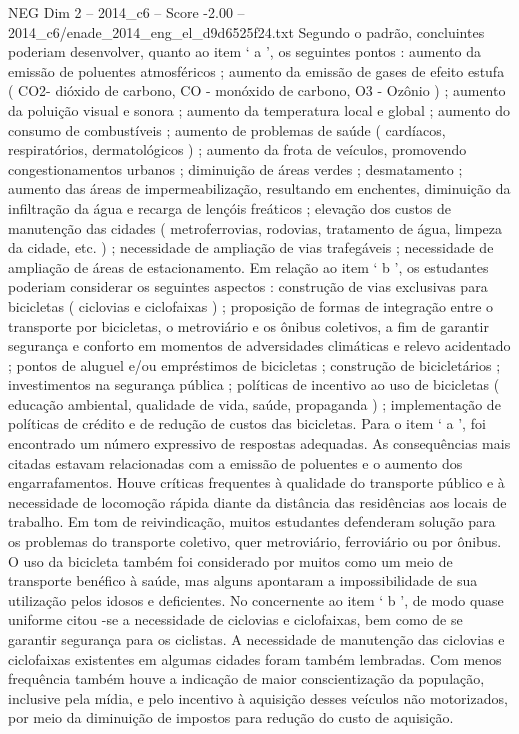 \begin{textsample}{NEG Dim 2 – 2014\_c6 – Score -2.00 – 2014\_c6/enade\_2014\_eng\_el\_d9d6525f24.txt}
Segundo o padrão, concluintes poderiam desenvolver, quanto ao item ‘ a ’, os seguintes pontos : aumento da emissão de poluentes atmosféricos ; aumento da emissão de gases de efeito estufa ( CO2- dióxido de carbono, CO - monóxido de carbono, O3 - Ozônio ) ; aumento da poluição visual e sonora ; aumento da temperatura local e global ; aumento do consumo de combustíveis ; aumento de problemas de saúde ( cardíacos, respiratórios, dermatológicos ) ; aumento da frota de veículos, promovendo congestionamentos urbanos ; diminuição de áreas verdes ; desmatamento ; aumento das áreas de impermeabilização, resultando em enchentes, diminuição da infiltração da água e recarga de lençóis freáticos ; elevação dos custos de manutenção das cidades ( metroferrovias, rodovias, tratamento de água, limpeza da cidade, etc. ) ; necessidade de ampliação de vias trafegáveis ; necessidade de ampliação de áreas de estacionamento.
Em relação ao item ‘ b ’, os estudantes poderiam considerar os seguintes aspectos : construção de vias exclusivas para bicicletas ( ciclovias e ciclofaixas ) ; proposição de formas de integração entre o transporte por bicicletas, o metroviário e os ônibus coletivos, a fim de garantir segurança e conforto em momentos de adversidades climáticas e relevo acidentado ; pontos de aluguel e/ou empréstimos de bicicletas ; construção de bicicletários ; investimentos na segurança pública ; políticas de incentivo ao uso de bicicletas ( educação ambiental, qualidade de vida, saúde, propaganda ) ; implementação de políticas de crédito e de redução de custos das bicicletas.
Para o item ‘ a ’, foi encontrado um número expressivo de respostas adequadas.
As consequências mais citadas estavam relacionadas com a emissão de poluentes e o aumento dos engarrafamentos.
Houve críticas frequentes à qualidade do transporte público e à necessidade de locomoção rápida diante da distância das residências aos locais de trabalho.
Em tom de reivindicação, muitos estudantes defenderam solução para os problemas do transporte coletivo, quer metroviário, ferroviário ou por ônibus.
O uso da bicicleta também foi considerado por muitos como um meio de transporte benéfico à saúde, mas alguns apontaram a impossibilidade de sua utilização pelos idosos e deficientes.
No concernente ao item ‘ b ’, de modo quase uniforme citou -se a necessidade de ciclovias e ciclofaixas, bem como de se garantir segurança para os ciclistas.
A necessidade de manutenção das ciclovias e ciclofaixas existentes em algumas cidades foram também lembradas.
Com menos frequência também houve a indicação de maior conscientização da população, inclusive pela mídia, e pelo incentivo à aquisição desses veículos não motorizados, por meio da diminuição de impostos para redução do custo de aquisição.

\end{textsample}
